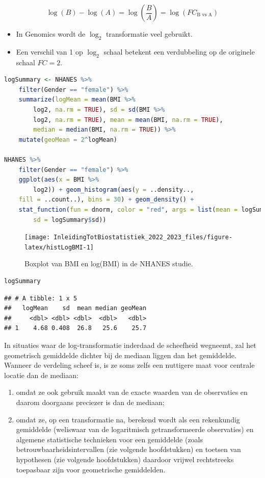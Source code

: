 \documentclass[
  12pt,dutch,coursenotes]{book}
\begin{document}
\[
\log (B) - \log(A)= \log(\frac{B}{A})=\log(FC_\text{B vs A})
\]

\begin{itemize}
\item
  In Genomics wordt de \(\log_2\) transformatie veel gebruikt.
\item
  Een verschil van 1 op \(\log_2\) schaal betekent een verdubbeling op de originele schaal \(FC=2\).
\end{itemize}

\begin{lstlisting}[language=R]
logSummary <- NHANES %>%
    filter(Gender == "female") %>%
    summarize(logMean = mean(BMI %>%
        log2, na.rm = TRUE), sd = sd(BMI %>%
        log2, na.rm = TRUE), mean = mean(BMI, na.rm = TRUE),
        median = median(BMI, na.rm = TRUE)) %>%
    mutate(geoMean = 2^logMean)

NHANES %>%
    filter(Gender == "female") %>%
    ggplot(aes(x = BMI %>%
        log2)) + geom_histogram(aes(y = ..density..,
    fill = ..count..), bins = 30) + geom_density() +
    stat_function(fun = dnorm, color = "red", args = list(mean = logSummary$logMean,
        sd = logSummary$sd))
\end{lstlisting}

\begin{figure}

{\centering \texttt{[image: InleidingTotBiostatistiek\_2022\_2023\_files/figure-latex/histLogBMI-1]} 

}

\caption{Boxplot van BMI en log(BMI) in de NHANES studie.}\label{fig:histLogBMI}
\end{figure}

\begin{lstlisting}[language=R]
logSummary
\end{lstlisting}

\begin{lstlisting}
## # A tibble: 1 x 5
##   logMean    sd  mean median geoMean
##     <dbl> <dbl> <dbl>  <dbl>   <dbl>
## 1    4.68 0.408  26.8   25.6    25.7
\end{lstlisting}

In situaties waar de log-transformatie inderdaad de scheefheid wegneemt, zal
het geometrisch gemiddelde dichter bij de mediaan liggen dan het gemiddelde.
Wanneer de verdeling scheef is, is ze soms zelfs een nuttigere maat voor centrale
locatie dan de mediaan:

\begin{enumerate}
\def\labelenumi{\arabic{enumi}.}
\item
  omdat ze ook gebruik maakt van de exacte waarden van de observaties en
  daarom doorgaans preciezer is dan de mediaan;
\item
  omdat ze, op een transformatie na, berekend wordt als een rekenkundig
  gemiddelde (weliswaar van de logaritmisch getransformeerde observaties) en
  algemene statistische technieken voor een gemiddelde (zoals
  betrouwbaarheidsintervallen (zie volgende hoofdstukken) en toetsen van hypothesen (zie volgende hoofdstukken) daardoor vrijwel rechtstreeks
  toepasbaar zijn voor geometrische gemiddelden.
\end{enumerate}
\end{document}
